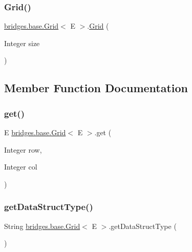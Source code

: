 \subsubsection{\texorpdfstring{Grid()}{Grid()}\hspace{0.1cm}{\footnotesize\ttfamily [2/2]}}
{\footnotesize\ttfamily \mbox{\hyperlink{classbridges_1_1base_1_1_grid}{bridges.\+base.\+Grid}}$<$ E $>$.\mbox{\hyperlink{classbridges_1_1base_1_1_grid}{Grid}} (\begin{DoxyParamCaption}\item[{Integer}]{size }\end{DoxyParamCaption})}



\subsection{Member Function Documentation}
\mbox{\label{classbridges_1_1base_1_1_grid_a698579bb5b7166f76a18a1b04916e090}} 
\subsubsection{\texorpdfstring{get()}{get()}}
{\footnotesize\ttfamily E \mbox{\hyperlink{classbridges_1_1base_1_1_grid}{bridges.\+base.\+Grid}}$<$ E $>$.get (\begin{DoxyParamCaption}\item[{Integer}]{row,  }\item[{Integer}]{col }\end{DoxyParamCaption})}

\mbox{\label{classbridges_1_1base_1_1_grid_a81f268dd27c292ff2af9358039d4ebe6}} 
\subsubsection{\texorpdfstring{get\+Data\+Struct\+Type()}{getDataStructType()}}
{\footnotesize\ttfamily String \mbox{\hyperlink{classbridges_1_1base_1_1_grid}{bridges.\+base.\+Grid}}$<$ E $>$.get\+Data\+Struct\+Type (\begin{DoxyParamCaption}{ }\end{DoxyParamCaption})}

